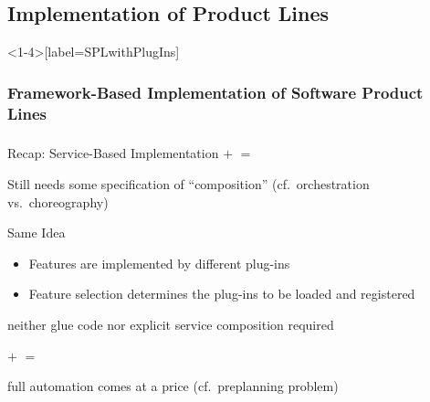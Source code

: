 \subsection{Implementation of Product Lines}
\begin{frame}<1-4>[label=SPLwithPlugIns]
	\frametitle<1-4>{Framework-Based Implementation of Software Product Lines}
	\frametitle<5>{\myframetitle}
	\begin{fancycolumns}[widths={40},animation=none]
		\begin{example}{Recap: Service-Based Implementation}
			$+$ 
			$=$
		\end{example}
		\begin{example}{Still needs some specification of ``composition'' (cf.\ orchestration vs.\ choreography)}
			\centering
		\end{example}
	\nextcolumn		
		\pause
		\begin{definition}{Same Idea}
			\begin{itemize}
				\item Features are implemented by different plug-ins
				\item Feature selection determines the plug-ins to be loaded and registered 
			\end{itemize}
		\end{definition}
		\pause
		\begin{note}{}
				neither glue code nor explicit service composition required
		\end{note}
		\begin{example}{}
			$+$
			$=$
		\end{example}
		\pause
		\begin{note}{}
				full automation comes at a price (cf.\ preplanning problem)
		\end{note}		
	\end{fancycolumns}	
\end{frame}

